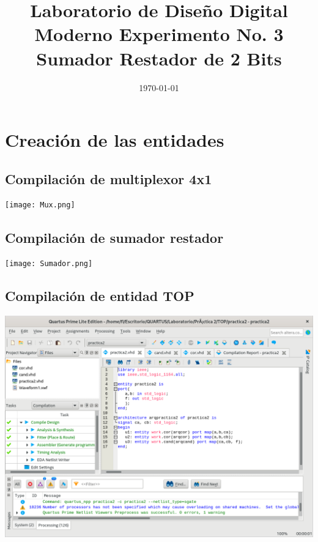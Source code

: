\documentclass[10pt,a4paper]{article}
\title{Laboratorio de Diseño Digital Moderno Experimento No. 3 Sumador Restador de 2 Bits}
\author{}
\date{\today}
\begin{document}
	\maketitle
	
	\section{Creación de las entidades}
	\subsection{Compilación de multiplexor 4x1 }
	\begin{center}
		\texttt{[image: Mux.png]}
	\end{center}
	
	\subsection{Compilación de sumador restador}
	\begin{center}
		\texttt{[image: Sumador.png]}
	\end{center}
	
	\subsection{Compilación de entidad TOP}
	\begin{center}
		\includegraphics[scale=0.35]{Top.png}
	\end{center}
	
\end{document}

